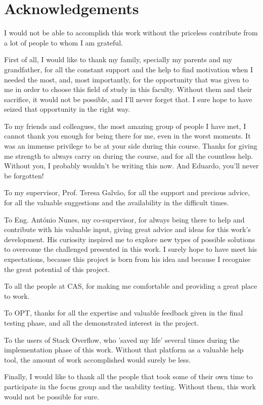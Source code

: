 \chapter*{Acknowledgements}

I would not be able to accomplish this work without the priceless contribute from a lot of people to whom I am grateful.

First of all, I would like to thank my family, specially my parents and my grandfather, for all the constant support and the help to find motivation when I needed the most, and, most importantly, for the opportunity that was given to me in order to choose this field of study in this faculty. Without them and their sacrifice, it would not be possible, and I'll never forget that. I sure hope to have seized that opportunity in the right way.

To my friends and colleagues, the most amazing group of people I have met, I cannot thank you enough for being there for me, even in the worst moments. It was an immense privilege to be at your side during this course. Thanks for giving me strength to always carry on during the course, and for all the countless help. Without you, I probably wouldn't be writing this now. And Eduardo, you'll never be forgotten!

To my supervisor, Prof. Teresa Galvão, for all the support and precious advice, for all the valuable suggestions and the availability in the difficult times.

To Eng. António Nunes, my co-supervisor, for always being there to help and contribute with his valuable input, giving great advice and ideas for this work's development. His curiosity inspired me to explore new types of possible solutions to overcome the challenged presented in this work. I surely hope to have meet his expectations, because this project is born from his idea and because I recognise the great potential of this project.

To all the people at CAS, for making me comfortable and providing a great place to work.

To OPT, thanks for all the expertise and valuable feedback given in the final testing phase, and all the demonstrated interest in the project.

To the users of Stack Overflow, who 'saved my life' several times during the implementation phase of this work. Without that platform as a valuable help tool, the amount of work accomplished would surely be less.

Finally, I would like to thank all the people that took some of their own time to participate in the focus group and the usability testing. Without them, this work would not be possible for sure.



\vspace{10mm}
